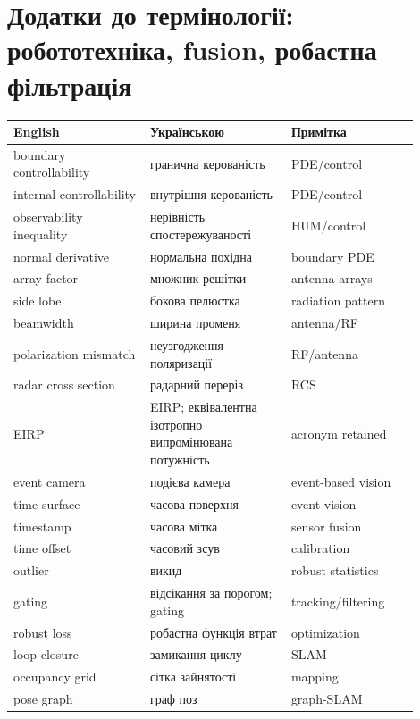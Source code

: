 \chapter{Додатки до термінології: робототехніка, fusion, робастна фільтрація}
\begin{longtable}{L{0.30\linewidth}L{0.31\linewidth}L{0.29\linewidth}}
\toprule
English & Українською & Примітка \\
\midrule
\endhead
boundary controllability & гранична керованість & PDE/control \\
internal controllability & внутрішня керованість & PDE/control \\
observability inequality & нерівність спостережуваності & HUM/control \\
normal derivative & нормальна похідна & boundary PDE \\
array factor & множник решітки & antenna arrays \\
side lobe & бокова пелюстка & radiation pattern \\
beamwidth & ширина променя & antenna/RF \\
polarization mismatch & неузгодження поляризації & RF/antenna \\
radar cross section & радарний переріз & RCS \\
EIRP & EIRP; еквівалентна ізотропно випромінювана потужність & acronym retained \\
event camera & подієва камера & event-based vision \\
time surface & часова поверхня & event vision \\
timestamp & часова мітка & sensor fusion \\
time offset & часовий зсув & calibration \\
outlier & викид & robust statistics \\
gating & відсікання за порогом; gating & tracking/filtering \\
robust loss & робастна функція втрат & optimization \\
loop closure & замикання циклу & SLAM \\
occupancy grid & сітка зайнятості & mapping \\
pose graph & граф поз & graph-SLAM \\
\bottomrule
\end{longtable}
